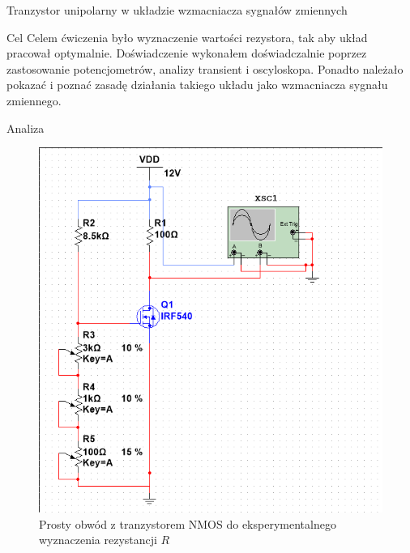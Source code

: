 \documentclass[a4paper]{scrartcl}
\begin{document}
	\newpage
	\begin{section}{Tranzystor unipolarny w układzie wzmacniacza sygnałów zmiennych}
		\begin{subsection}{Cel}
			Celem ćwiczenia było wyznaczenie wartości rezystora, tak aby układ pracował optymalnie. Doświadczenie wykonałem doświadczalnie poprzez zastosowanie potencjometrów, analizy transient i oscyloskopa. Ponadto należało pokazać i poznać zasadę działania takiego układu jako wzmacniacza sygnału zmiennego.
		\end{subsection}

		\begin{subsection}{Analiza}
				\begin{figure}[!ht]
				\begin{center}
					\includegraphics[width=0.5\linewidth,scale=2]{exercise-2-circuit-pre-change}
					\caption{Prosty obwód z tranzystorem NMOS do eksperymentalnego wyznaczenia rezystancji $ R $}
					\label{fig:circuit-2-circuit-pre-change}
				\end{center}


\end{figure}
\end{subsection}
\end{section}
\end{document}

